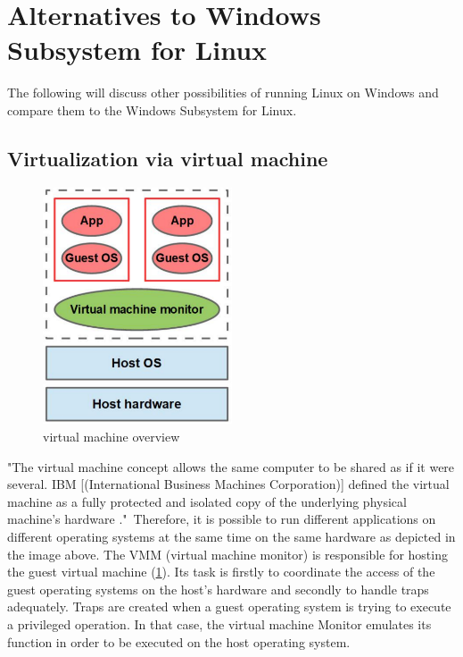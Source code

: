 \documentclass[utf8,biblatex, ngerman, english]{lni}
\begin{document}
\section{Alternatives to Windows Subsystem for Linux}
The following will discuss other possibilities of running Linux on Windows and compare them to the Windows Subsystem for Linux.

\subsection{Virtualization via virtual machine}

\begin{figure}
  \centering
  \includegraphics[width=0.5\textwidth]{VM.pdf}
  \caption{virtual machine overview}
  \label{img:vm}
\end{figure}


"The virtual machine concept allows the same computer to be shared as if it were several. IBM [(International Business Machines Corporation)] defined the virtual machine as a fully protected and isolated copy of the underlying physical machine’s hardware \cite[p. 2]{Ro01}."\ 
Therefore, it is possible to run different applications on different operating systems at the same time on the same hardware as depicted in the image above. The VMM (virtual machine monitor) is responsible for hosting the guest virtual machine \cite[p. 3]{Ro01} (\ref{img:vm}). Its task is firstly to coordinate the access of the guest operating systems on the host's hardware and secondly to handle traps adequately. Traps are created when a guest operating system is trying to execute a privileged operation. In that case, the virtual machine Monitor emulates its function in order to be executed on the host operating system.
\end{document}
